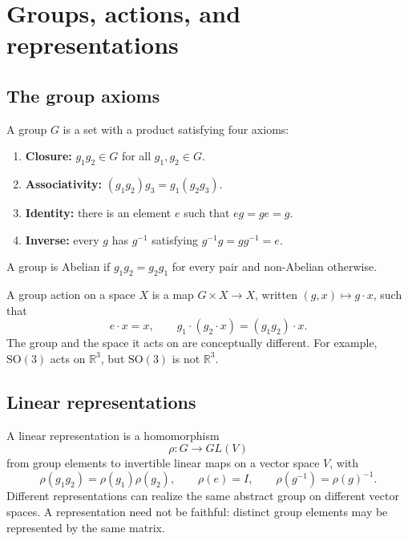 \documentclass[11pt]{article}
\newcommand{\R}{\mathbb{R}}
\newcommand{\SO}{\mathrm{SO}}
\begin{document}
\section{Groups, actions, and representations}

\subsection{The group axioms}

A group $G$ is a set with a product satisfying four axioms:
\begin{enumerate}
  \item \textbf{Closure:} $g_1g_2\in G$ for all $g_1,g_2\in G$.
  \item \textbf{Associativity:}
  $(g_1g_2)g_3=g_1(g_2g_3)$.
  \item \textbf{Identity:} there is an element $e$ such that
  $eg=ge=g$.
  \item \textbf{Inverse:} every $g$ has $g^{-1}$ satisfying
  $g^{-1}g=gg^{-1}=e$.
\end{enumerate}
A group is Abelian if $g_1g_2=g_2g_1$ for every pair and non-Abelian
otherwise.

A group action on a space $X$ is a map $G\times X\to X$, written
$(g,x)\mapsto g\cdot x$, such that
\begin{equation}
  e\cdot x=x,
  \qquad
  g_1\cdot(g_2\cdot x)=(g_1g_2)\cdot x.
  \label{eq:groupaction}
\end{equation}
The group and the space it acts on are conceptually different.  For example,
$\SO(3)$ acts on $\R^3$, but $\SO(3)$ is not $\R^3$.

\subsection{Linear representations}

A linear representation is a homomorphism
\begin{equation}
  \rho:G\longrightarrow GL(V)
  \label{eq:representationmap}
\end{equation}
from group elements to invertible linear maps on a vector space $V$, with
\begin{equation}
  \rho(g_1g_2)=\rho(g_1)\rho(g_2),
  \qquad
  \rho(e)=I,
  \qquad
  \rho(g^{-1})=\rho(g)^{-1}.
  \label{eq:representationproperties}
\end{equation}
Different representations can realize the same abstract group on different
vector spaces.  A representation need not be faithful: distinct group
elements may be represented by the same matrix.
\end{document}
